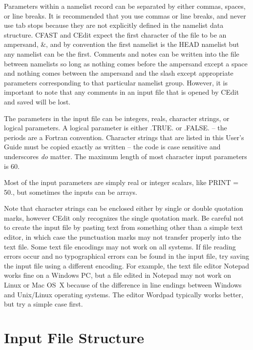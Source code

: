 Parameters within a namelist record can be separated by either commas, spaces, or line breaks. It is recommended that you use commas or line breaks, and never use tab stops because they are not explicitly defined in the namelist data structure. CFAST and CEdit expect the first character of the file to be an ampersand, {\ct \&}, and by convention the first namelist is the {\ct HEAD} namelist but any namelist can be the first. Comments and notes can be written into the file between namelists so long as nothing comes before the ampersand except a space and nothing comes between the ampersand and the slash except appropriate parameters corresponding to that particular namelist group. However, it is important to note that any comments in an  input file that is opened by CEdit and saved will be lost.

The parameters in the input file can be integers, reals, character strings, or logical parameters. A logical parameter is either {\ct .TRUE.} or {\ct .FALSE.} -- the periods are a Fortran convention. Character strings that are listed in this User's Guide must be copied exactly as written -- the code is case sensitive and underscores {\em do} matter. The maximum length of most character input parameters is 60.

Most of the input parameters are simply real or integer scalars, like {\ct PRINT = 50.}, but sometimes the inputs can be arrays.

Note that character strings can be enclosed either by single or double quotation marks, however CEdit only recognizes the single quotation mark. Be careful not to create the input file by pasting text from something other than a simple text editor, in which case the punctuation marks may not transfer properly into the text file. Some text file encodings may not work on all systems. If file reading errors occur and no typographical errors can be found in the input file, try saving the input file using a different encoding. For example, the text file editor Notepad works fine on a Windows PC, but a file edited in Notepad may not work on Linux or Mac OS~X because of the difference in line endings between Windows and Unix/Linux operating systems. The editor Wordpad typically works better, but try a simple case first.


\section{Input File Structure}

